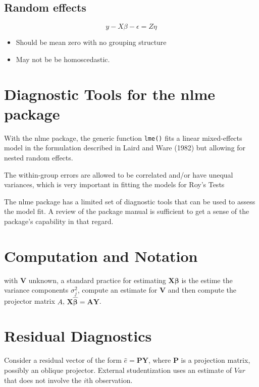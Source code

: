 \documentclass[Main.tex]{subfiles}
\begin{document}
\subsection*{Random effects}
\[y - X\beta -\epsilon = Z \eta \]
\begin{itemize}
	\item
	Should be mean zero with no grouping structure
	\item
	May not be be homoscedastic.
\end{itemize}


\section{Diagnostic Tools for the nlme package}


With the nlme package, the generic function \texttt{lme()} fits a linear mixed-effects model in the formulation described in Laird and Ware (1982) but allowing for nested random effects. 

The within-group errors are allowed to be correlated and/or have unequal variances, which is very important in fitting the models for Roy's Tests

The nlme package has a limited set of diagnostic tools that can be used to assess the model fit. A review of the package manual is sufficient to get a sense of the package's capability in that regard.




\section{Computation and Notation } %
with $\boldsymbol{V}$ unknown, a standard practice for estimating $\boldsymbol{X \beta}$ is the estime the variance components $\sigma^2_j$,
compute an estimate for $\boldsymbol{V}$ and then compute the projector matrix $A$, $\boldsymbol{X \hat{\beta}}  = \boldsymbol{AY}$.






\section{Residual Diagnostics}

Consider a residual vector of the form $\hat{e} = \boldsymbol{PY} $, where $\boldsymbol{P}$ is a projection matrix, possibly an oblique projector.
External studentization uses an estimate of $Var$ that does not involve the $i$th observation.
\end{document}

